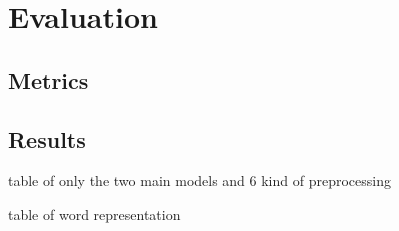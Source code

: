 \section{Evaluation} \label{sec:evaluation}

\subsection{Metrics}

\subsection{Results}

table of only the two main models and 6 kind of preprocessing

table of word representation


